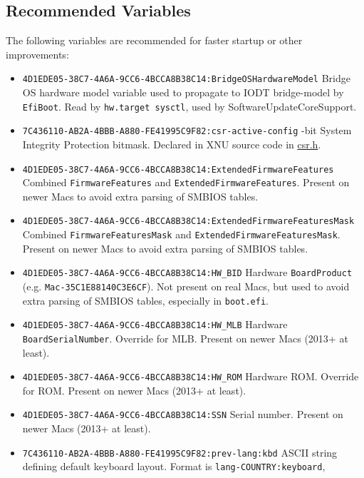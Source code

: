 \documentclass[]{article}
\makeatletter
\providecommand{\tightlist}{%
  \setlength{\itemsep}{0pt}\setlength{\parskip}{0pt}}
\renewcommand{\label}[1]{%
\zref@wrapper@immediate{\oldlabel{#1}}}  %
\makeatother
\begin{document}
\subsection{Recommended Variables}\label{nvramvarsrec}

The following variables are recommended for faster startup or other
improvements:

\begin{itemize}
\tightlist
\item
  \texttt{4D1EDE05-38C7-4A6A-9CC6-4BCCA8B38C14:BridgeOSHardwareModel}
  \break
  Bridge OS hardware model variable used to propagate to IODT bridge-model
  by \texttt{EfiBoot}. Read by \texttt{hw.target sysctl}, used by
  SoftwareUpdateCoreSupport.
\item
  \texttt{7C436110-AB2A-4BBB-A880-FE41995C9F82:csr-active-config}
  -bit System Integrity Protection bitmask. Declared in XNU source code in
  \href{https://opensource.apple.com/source/xnu/xnu-4570.71.2/bsd/sys/csr.h.auto.html}{csr.h}.
\item
  \texttt{4D1EDE05-38C7-4A6A-9CC6-4BCCA8B38C14:ExtendedFirmwareFeatures}
  \break
  Combined \texttt{FirmwareFeatures} and \texttt{ExtendedFirmwareFeatures}. Present on
  newer Macs to avoid extra parsing of SMBIOS tables.
\item
  \texttt{4D1EDE05-38C7-4A6A-9CC6-4BCCA8B38C14:ExtendedFirmwareFeaturesMask}
  \break
  Combined \texttt{FirmwareFeaturesMask} and \texttt{ExtendedFirmwareFeaturesMask}.
  Present on newer Macs to avoid extra parsing of SMBIOS tables.
\item
  \texttt{4D1EDE05-38C7-4A6A-9CC6-4BCCA8B38C14:HW\_BID}
  \break
  Hardware \texttt{BoardProduct} (e.g. \texttt{Mac-35C1E88140C3E6CF}). Not present on
  real Macs, but used to avoid extra parsing of SMBIOS tables, especially in \texttt{boot.efi}.
\item
  \texttt{4D1EDE05-38C7-4A6A-9CC6-4BCCA8B38C14:HW\_MLB}
  \break
  Hardware \texttt{BoardSerialNumber}. Override for MLB. Present on newer Macs (2013+ at least).
\item
  \texttt{4D1EDE05-38C7-4A6A-9CC6-4BCCA8B38C14:HW\_ROM}
  \break
  Hardware ROM. Override for ROM. Present on newer Macs (2013+ at least).
\item
  \texttt{4D1EDE05-38C7-4A6A-9CC6-4BCCA8B38C14:SSN}
  \break
  Serial number. Present on newer Macs (2013+ at least).
\item
  \texttt{7C436110-AB2A-4BBB-A880-FE41995C9F82:prev-lang:kbd}
  \break
  ASCII string defining default keyboard layout. Format is \texttt{lang-COUNTRY:keyboard},

\end{itemize}
\end{document}
